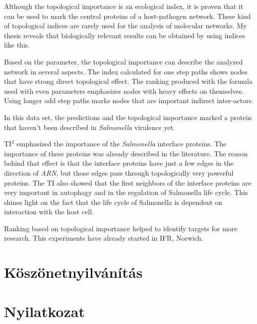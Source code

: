 \documentclass[a4paper,12pt]{article}
\begin{document}
		Although the topological importance is an ecological index, it is proven that it can be used to mark the central proteins of a host-pathogen network. These kind of topological indices are rarely used for the analysis of molecular networks. My thesis reveals that biologically relevant results can be obtained by using indices like this. 
		
		Based on the parameter, the topological importance can describe the analyzed network in several aspects. The index calculated for one step paths shows nodes that have strong direct topological effect. The ranking produced with the formula used with even parameters emphasizes nodes with heavy effects on themselves. Using longer odd step paths marks nodes that are important  indirect inter-actors.
		
		In this data set, the predictions and the topological importance marked a protein that haven't been described in \textit{Salmonella} virulence yet.

		TI$^2$ emphasized the importance of the \textit{Salmonella} interface proteins. The importance of these proteins was already described in the literature. The reason behind that effect is that the interface proteins have just a few edges in the direction of \textit{ARN}, but those edges pass through topologically very powerful proteins. The TI also showed that the first neighbors of the interface proteins are very important in autophagy and in the regulation of Salmonella life cycle. This shines light on the fact that the life cycle of Salmonella is dependent on interaction with the host cell. 

		Ranking based on topological importance helped to identify targets for more research. This experiments have already started in IFR, Norwich.
				
		\pagebreak

\section{Köszönetnyilvánítás}

\section{Nyilatkozat}

\pagebreak


{}

\end{document}
